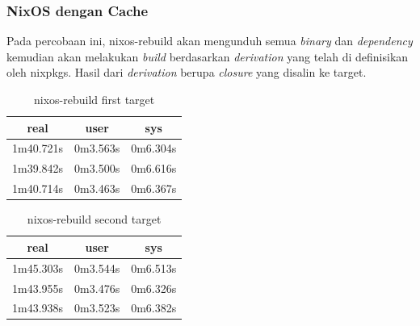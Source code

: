 \documentclass[10pt,]{report}
\begin{document}
\begin{adjustwidth}{20pt}{}
	\subsubsection{NixOS dengan Cache}
	\begin{adjustwidth}{20pt}{}
		Pada percobaan ini, nixos-rebuild akan mengunduh semua \textit{binary} dan
		\textit{dependency} kemudian akan melakukan \textit{build} berdasarkan
		\textit{derivation} yang telah di definisikan oleh nixpkgs. Hasil dari
		\textit{derivation} berupa \textit{closure} yang disalin ke target.
		\begin{table}[H]
			\caption{nixos-rebuild first target}
			\begin{center}
				\begin{tabular}[c]{|c|c|c|}
					\hline
					\multicolumn{1}{|c|}{\textbf{real}} &
					\multicolumn{1}{c|}{\textbf{user}}  &
					\multicolumn{1}{c|}{\textbf{sys}}                         \\
					\hline
					1m40.721s                           & 0m3.563s & 0m6.304s \\
					\hline
					1m39.842s                           & 0m3.500s & 0m6.616s \\
					\hline
					1m40.714s                           & 0m3.463s & 0m6.367s \\
					\hline
				\end{tabular}
			\end{center}
		\end{table}
		\vspace{-5mm}
		\begin{table}[H]
			\caption{nixos-rebuild second target}
			\begin{center}
				\begin{tabular}[c]{|c|c|c|}
					\hline
					\multicolumn{1}{|c|}{\textbf{real}} &
					\multicolumn{1}{c|}{\textbf{user}}  &
					\multicolumn{1}{c|}{\textbf{sys}}                         \\
					\hline
					1m45.303s                           & 0m3.544s & 0m6.513s \\
					\hline
					1m43.955s                           & 0m3.476s & 0m6.326s \\
					\hline
					1m43.938s                           & 0m3.523s & 0m6.382s \\
					\hline
				\end{tabular}
			\end{center}
		\end{table}
	\end{adjustwidth}

\end{adjustwidth}
\end{document}
